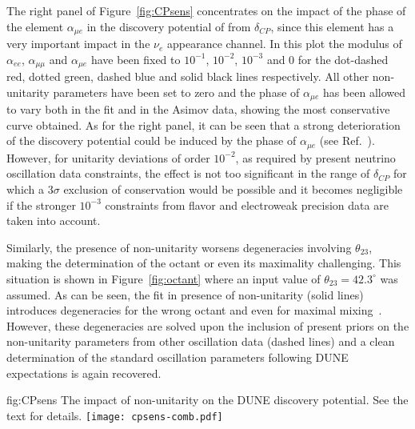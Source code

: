The right panel of Figure~\ref{fig:CPsens} concentrates on the impact of the phase of the element $\alpha_{\mu e}$ in the discovery potential of  from $\delta_{CP}$, since this element has a very important impact in the $\nu_e$ appearance channel. In this plot the modulus of $\alpha_{ee}$, $\alpha_{\mu \mu}$ and $\alpha_{\mu e}$ have been fixed to $10^{-1}$, $10^{-2}$, $10^{-3}$ and 0 for the dot-dashed red, dotted green, dashed blue and solid black lines respectively. All other non-unitarity parameters have been set to zero and the phase of $\alpha_{\mu e}$ has been allowed to vary both in the fit and in the Asimov data, showing the most conservative curve obtained. As for the right panel, it can be seen that a strong deterioration of the  discovery potential could be induced by the phase of $\alpha_{\mu e}$ (see Ref.~\cite{Escrihuela:2016ube}). However, for unitarity deviations of order $10^{-2}$, as required by present neutrino oscillation data constraints, the effect is not too significant in the range of $\delta_{CP}$ for which a $3 \sigma$ exclusion of  conservation would be possible and it becomes negligible if the stronger $10^{-3}$ constraints from flavor and electroweak precision data are taken into account.  

Similarly, the presence of non-unitarity worsens degeneracies involving $\theta_{23}$, making the determination of the octant or even its maximality challenging.
This situation is shown in Figure~\ref{fig:octant} where an input value of $\theta_{23} = 42.3^\circ$ was assumed. As can be seen, the fit in presence of non-unitarity (solid lines) introduces degeneracies for the wrong octant and even for maximal mixing~\cite{Blennow:2016jkn}. However, these degeneracies are solved upon the inclusion of present priors on the non-unitarity parameters from other oscillation data (dashed lines) and a clean determination of the standard oscillation parameters following DUNE expectations is again recovered.   

\begin{dunefigure}
{fig:CPsens}
{The impact of non-unitarity on the DUNE  discovery potential. See the text for details.}
 \texttt{[image: cpsens-comb.pdf]}
\end{dunefigure}

